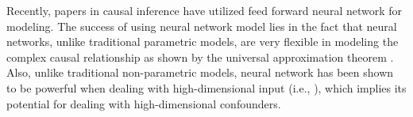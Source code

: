 \documentclass{article} %
\begin{document}
Recently, papers in causal inference \citep{johansson2016learning, alaa2017bayesian, shalit2017estimating, schwab2019learning, farrell2018deep,shi2019adapting} 
have utilized feed forward neural network for modeling. The success of using neural network model lies in the fact that neural networks, unlike traditional parametric models, are very flexible in modeling the complex causal relationship as shown by the universal approximation theorem \citep{csaji2001approximation}. Also, unlike traditional non-parametric models, neural network has been shown to be powerful when dealing with high-dimensional input (i.e., \citet{masci2011stacked, johansson2016learning}), which implies its potential for dealing with high-dimensional confounders.



\end{document}
